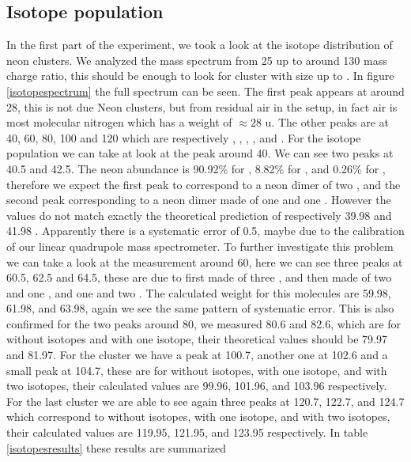 \documentclass[a4paper,10pt]{article}
\begin{document}
\subsection{Isotope population}
In the first part of the experiment, we took a look at the isotope distribution of neon clusters. We analyzed the mass spectrum from 25 up to around 130 mass charge ratio, this should be enough to look for cluster with size up to . In figure \ref{isotopespectrum} the full spectrum can be seen. The first peak appears at around 28, this is not due Neon clusters, but from residual air in the setup, in fact air is most molecular nitrogen  which has a weight of $\approx 28$ u. The other peaks are at 40, 60, 80, 100 and 120 which are respectively , , , , and . For the isotope population we can take at look at the peak around 40. We can see two peaks at 40.5 and 42.5. The neon abundance is 90.92\% for , 8.82\% for , and 0.26\% for  \cite{script}, therefore we expect the first peak to correspond to a neon dimer of two , and the second peak corresponding to a neon dimer made of one  and one . However the values do not match exactly the theoretical prediction of respectively 39.98 and 41.98 \cite{umc}. Apparently there is a systematic error of 0.5, maybe due to the calibration of our linear quadrupole mass spectrometer. To further investigate this problem we can take a look at the measurement around 60, here we can see three peaks at 60.5, 62.5 and 64.5, these are due to  first made of three , and then made of two  and one , and one  and two . The calculated weight for this molecules are 59.98, 61.98, and 63.98, again we see the same pattern of systematic error. This is also confirmed for the two peaks around 80, we measured 80.6 and 82.6, which are for  without isotopes and  with one  isotope, their theoretical values should be 79.97 and 81.97. For the cluster  we have a peak at 100.7, another one at 102.6 and a small peak at 104.7, these are for  without isotopes,  with one  isotope, and  with two  isotopes, their calculated values are 99.96, 101.96, and 103.96 respectively. For the last cluster  we are able to see again three peaks at 120.7, 122.7, and 124.7 which correspond to  without isotopes,  with one  isotope, and  with two  isotopes, their calculated values are 119.95, 121.95, and 123.95 respectively. In table \ref{isotopesresults} these results are summarized
\end{document}
